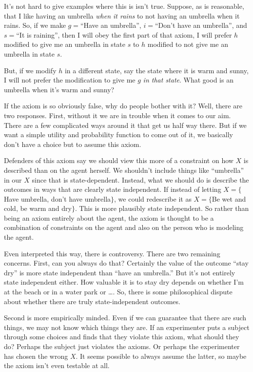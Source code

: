 It's not hard to give examples where this is isn't true.  Suppose, as is reasonable, that I like having an umbrella {\it when it rains} to not having an umbrella when it rains.  So, if we make $g = $``Have an umbrella'', $i = $``Don't have an umbrella'', and $s = $``It is raining'', then I will obey the first part of that axiom, I will prefer $h$ modified to give me an umbrella in state $s$ to $h$ modified to not give me an umbrella in state $s$. 

But, if we modify $h$ in a different state, say the state where it is warm and sunny, I will not prefer the modification to give me $g$ {\it in that state}.  What good is an umbrella when it's warm and sunny?  

If the axiom is so obviously false, why do people bother with it?  Well, there are two responses. First, without it we are in trouble when it comes to our aim.  There are a few complicated ways around it that get us half way there. But if we want a simple utility and probability function to come out of it, we basically don't have a choice but to assume this axiom.

Defenders of this axiom say we should view this more of a constraint on how $X$ is described than on the agent herself. We shouldn't include things like ``umbrella'' in our $X$ since that is state-dependent.  Instead, what we should do is describe the outcomes in ways that are clearly state independent.  If instead of letting $X = \{$Have umbrella, don't have umbrella$\}$, we could redescribe it as $X = \{$Be wet and cold, be warm and dry$\}$.  This is more plausibly state independent. So rather than being an axiom entirely about the agent, the axiom is thought to be a combination of constraints on the agent and also on the person who is modeling the agent. 

Even interpreted this way, there is controversy. There are two remaining concerns. First, can you always do that?  Certainly the value of the outcome ``stay dry'' is more state independent than ``have an umbrella.'' But it's not entirely state independent either. How valuable it is to stay dry depends on whether I'm at the beach or in a water park or \dots.  So, there is some philosophical dispute about whether there are truly state-independent outcomes.

Second is more empirically minded.  Even if we can guarantee that there are such things, we may not know which things they are. If an experimenter puts a subject through some choices and finds that they violate this axiom, what should they do? Perhaps the subject just violates the axioms. Or perhaps the experimenter has chosen the wrong $X$. It seems possible to always assume the latter, so maybe the axiom isn't even testable at all.

